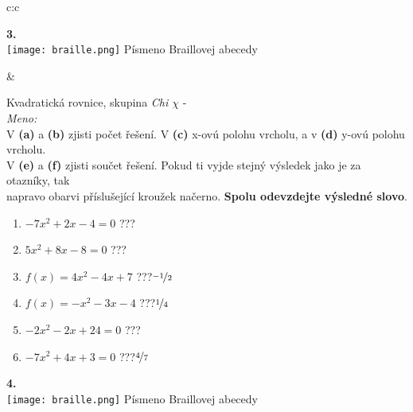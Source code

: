\documentclass[10pt]{report}
\begin{document}
\begin{tabular}{c:c}
\begin{minipage}[c][99mm][t]{0.49\linewidth}
\begin{center}
\begin{minipage}{0.20\linewidth}
\begin{center}
{\Huge\bfseries 3.} \\[2mm]
\texttt{[image: braille.png]}
{\small Písmeno Braillovej abecedy}
\end{center}
\end{minipage}
\end{center}
\end{minipage}
&
\begin{minipage}[c][99mm][t]{0.49\linewidth}
\begin{center}
\vspace{7mm}
{\huge Kvadratická rovnice, skupina \textit{Chi $\chi$} -}\\[4.5mm]
\textit{Meno:}\phantom{xxxxxxxxxxxxxxxxxxxxxxxxxxxxxxxxxxxxxxxxxxxxxxxxxxxxxxxxxxxxxxxxx}\\[3.5mm]
V \textbf{(a)} a \textbf{(b)} zjisti počet řešení. V \textbf{(c)} x-ovú polohu vrcholu, a v \textbf{(d)} y-ovú polohu vrcholu.\\V \textbf{(e)} a \textbf{(f)} zjisti součet řešení. Pokud ti vyjde stejný výsledek jako je za otazníky, tak\\napravo obarvi příslušející kroužek načerno. \textbf{Spolu odevzdejte výsledné slovo}.\\[3mm]
\begin{minipage}{0.77\linewidth}
\begin{center}
\begin{varwidth}{\textwidth}
\begin{enumerate}
\large
\item $-7x^2+2x-4=0$\quad \dotfill\; ???\;\dotfill {}
\item $5x^2+8x-8=0$\quad \dotfill\; ???\;\dotfill {}
\item $f(x)=4x^2-4x+7$\quad \dotfill\; ???\;\dotfill \quad $\nicefrac{-1}{2}$
\item $f(x)=-x^2-3x-4$\quad \dotfill\; ???\;\dotfill \quad $\nicefrac{1}{4}$
\item $-2x^2-2x+24=0$\quad \dotfill\; ???\;\dotfill {}
\item $-7x^2+4x+3=0$\quad \dotfill\; ???\;\dotfill \quad $\nicefrac{4}{7}$
\end{enumerate}
\end{varwidth}
\end{center}
\end{minipage}
\begin{minipage}{0.20\linewidth}
\begin{center}
{\Huge\bfseries 4.} \\[2mm]
\texttt{[image: braille.png]}
{\small Písmeno Braillovej abecedy}
\end{center}
\end{minipage}
\end{center}
\end{minipage}

\end{tabular}
\end{document}
